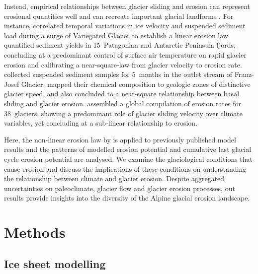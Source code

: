 \documentclass[esurf, manuscript]{copernicus}
\begin{document}
    Instead, empirical relationships between glacier sliding and erosion can
    represent erosional quantities well and can recreate important glacial
    landforms \citep[e.g.,][]{Harbor.etal.1988, Macgregor.etal.2000}.
    For instance, \citet{Humphrey.Raymond.1994} correlated temporal variations
    in ice velocity and suspended sediment load during a surge of Variegated
    Glacier to establish a linear erosion law.
    \citet{Koppes.etal.2015} quantified sediment
    yields in 15~Patagonian and Antarctic Peninsula fjords, concluding at a
    predominant control of surface air temperature on rapid glacier erosion and
    calibrating a near-square-law from glacier velocity to erosion rate.
    \citet{Herman.etal.2015} collected suspended sediment samples for 5~months
    in the outlet stream of Franz-Josef Glacier, mapped their chemical
    composition to geologic zones of distinctive glacier speed, and also
    concluded to a near-square relationship between basal sliding and glacier
    erosion.
    \citet{Cook.etal.2020} assembled a global compilation of erosion rates for
    38~glaciers, showing a predominant role of glacier sliding velocity over
    climate variables, yet concluding at a sub-linear relationship to erosion.

    Here, the non-linear erosion law by \citet{Koppes.etal.2015} is applied to
    previously published model results \citep{Seguinot.etal.2018} and the
    patterns of modelled erosion potential and cumulative last glacial cycle
    erosion
    potential are analysed. We examine the glaciological conditions that cause
    erosion and discuss the implications of these conditions on understanding
    the relationship between climate and glacier erosion. Despite aggregated
    uncertainties on paleoclimate, glacier flow and glacier erosion processes,
    out results provide insights into the diversity of the Alpine glacial
    erosion landscape.


\section{Methods}

\subsection{Ice sheet modelling}
\end{document}
